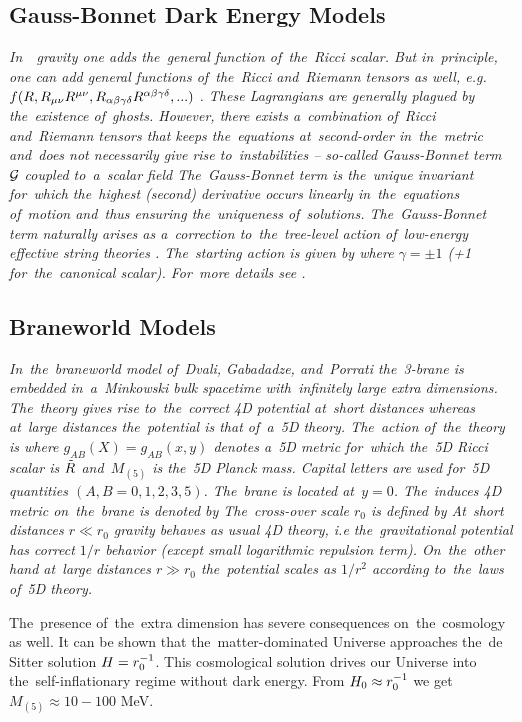 \subsection{Gauss-Bonnet Dark Energy Models}
{\itshape
In~\fR\ gravity one adds the~general function of~the~Ricci scalar. But in~principle, one can add general functions of~the~Ricci and~Riemann tensors as well, e.g. $f(R,R_{\mu\nu} R^{\mu\nu},R_{\alpha\beta\gamma\delta}R^{\alpha\beta\gamma\delta},...)$ \parencite{2005PhRvD..71f3513C}. These Lagrangians are generally plagued by the~existence of~ghosts.  However, there exists a~combination of~Ricci and~Riemann tensors that keeps the~equations at~second-order in~the~metric and~does not necessarily give rise to~instabilities -- so-called Gauss-Bonnet term $\mathcal{G}$ coupled to~a~scalar field
The~Gauss-Bonnet term is the~unique invariant for~which the~highest (second) derivative occurs linearly in~the~equations of~motion and~thus ensuring the~uniqueness of~solutions. The~Gauss-Bonnet term naturally arises as a~correction to~the~tree-level action of~low-energy effective string theories \parencite{2000PhR...337..343L}. The~starting action is given by
where $\gamma=\pm1$ (+1 for~the~canonical scalar). For~more details see \textcite{2005PhRvD..71l3509N,2006JCAP...06..004N,2013PhRvD..87h4037C}.
} %
\subsection{Braneworld Models}
{\itshape
In~the~braneworld model of~Dvali, Gabadadze, and~Porrati \parencite[DGP model][]{2000PhLB..485..208D} the~3-brane is embedded in~a~Minkowski bulk spacetime with~infinitely large extra dimensions. The~theory gives rise to~the~correct 4D potential at~short distances whereas at~large distances the~potential is that of~a~5D theory. The~action of~the~theory is
where $g_{AB}(X)=g_{AB}(x,y)$ denotes a~5D metric for~which the~5D Ricci scalar is ${\tilde{R}}$ and~$M_{(5)}$ is the~5D Planck mass. Capital letters are used for~5D quantities $(A,B=0,1,2,3,5)$. The~brane is located at~$y=0$. The~induces 4D metric on~the~brane is denoted by
The~cross-over scale $r_0$ is defined by
At~short distances $r\ll r_0$ gravity behaves as usual 4D theory, i.e the~gravitational potential has correct $1/r$ behavior (except small logarithmic repulsion term). On~the~other hand at~large distances $r\gg r_0$ the~potential scales as $1/r^2$ according to~the~laws of~5D theory.

The~presence of~the~extra dimension has severe consequences on~the~cosmology as well. It can be shown \parencite{2010deto.book.....A,2009PhLB..674..237M} that the~matter-dominated Universe approaches the~de Sitter solution $H=r_0^{-1}$. This cosmological solution drives our Universe into the~self-inflationary regime without dark energy. From $H_0\approx r_0^{-1}$ we get $M_{(5)}\approx10-100$ MeV.
} %
